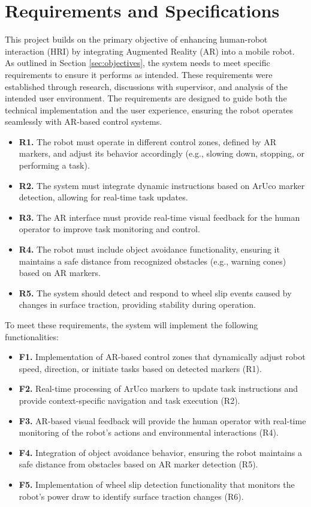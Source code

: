 \chapter{\label{ch:req_and_specs} Requirements and Specifications}

This project builds on the primary objective of enhancing human-robot interaction (HRI) by integrating Augmented Reality (AR) into a mobile robot. As outlined in Section \ref{sec:objectives}, the system needs to meet specific requirements to ensure it performs as intended. These requirements were established through research, discussions with supervisor, and analysis of the intended user environment. The requirements are designed to guide both the technical implementation and the user experience, ensuring the robot operates seamlessly with AR-based control systems.

\begin{itemize}
    \item \textbf{R1.} The robot must operate in different control zones, defined by AR markers, and adjust its behavior accordingly (e.g., slowing down, stopping, or performing a task).
    \item \textbf{R2.} The system must integrate dynamic instructions based on ArUco marker detection, allowing for real-time task updates.
    \item \textbf{R3.} The AR interface must provide real-time visual feedback for the human operator to improve task monitoring and control.
    \item \textbf{R4.} The robot must include object avoidance functionality, ensuring it maintains a safe distance from recognized obstacles (e.g., warning cones) based on AR markers.
    \item \textbf{R5.} The system should detect and respond to wheel slip events caused by changes in surface traction, providing stability during operation.
\end{itemize}

To meet these requirements, the system will implement the following functionalities:

\begin{itemize}
    \item \textbf{F1.} Implementation of AR-based control zones that dynamically adjust robot speed, direction, or initiate tasks based on detected markers (R1).
    \item \textbf{F2.} Real-time processing of ArUco markers to update task instructions and provide context-specific navigation and task execution (R2).
    \item \textbf{F3.} AR-based visual feedback will provide the human operator with real-time monitoring of the robot’s actions and environmental interactions (R4).
    \item \textbf{F4.} Integration of object avoidance behavior, ensuring the robot maintains a safe distance from obstacles based on AR marker detection (R5).
    \item \textbf{F5.} Implementation of wheel slip detection functionality that monitors the robot's power draw to identify surface traction changes (R6).
\end{itemize}

